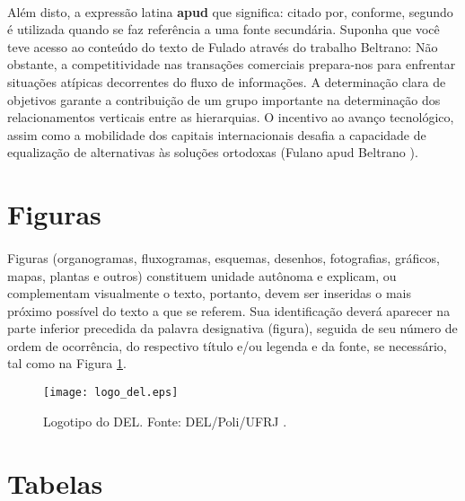 \paragraph{}Além disto, a expressão latina \textbf{apud} que significa: citado por, conforme, segundo é utilizada quando se faz referência a uma fonte secundária. Suponha que você teve acesso ao conteúdo do texto de Fulado através do trabalho Beltrano:
Não obstante, a competitividade nas transações comerciais prepara-nos para enfrentar situações atípicas decorrentes do fluxo de informações. A determinação clara de objetivos garante a contribuição de um grupo importante na determinação dos relacionamentos verticais entre as hierarquias. O incentivo ao avanço tecnológico, assim como a mobilidade dos capitais internacionais desafia a capacidade de equalização de alternativas às soluções ortodoxas (Fulano \cite{Fulano03} apud Beltrano \cite{Beltrano99}).

\section{Figuras}

\paragraph{}Figuras (organogramas, fluxogramas, esquemas, desenhos, fotografias, gráficos, mapas, plantas e outros) constituem unidade autônoma e explicam, ou complementam visualmente o texto, portanto, devem ser inseridas o mais próximo possível do texto a que se referem. Sua identificação deverá aparecer na parte inferior precedida da palavra designativa (figura), seguida de seu número de ordem de ocorrência, do respectivo título e/ou legenda e da fonte, se necessário, tal como na Figura \ref{FigDel}.

\begin{figure}
\begin{center}
\parbox[htb]{13.0cm}
  {
  \begin{center}
  \texttt{[image: logo\_del.eps]}
  \caption[\small{Logotipo do DEL. Fonte: DEL/Poli/UFRJ \cite{Meyer97}.}]{\label{FigDel} \small{Logotipo do DEL. Fonte: DEL/Poli/UFRJ \cite{Meyer97}.}}
  \end{center}
  }
\end{center}
\end{figure}

\section{Tabelas}
